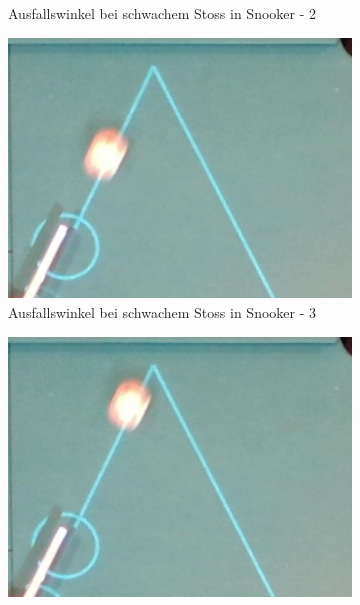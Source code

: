 \begin{figure}[h!]
\begin{subfigure}[b]{0.2\textwidth}
        \caption{Ausfallswinkel bei schwachem Stoss in Snooker - 2}
        \label{fig:rebound_angle_slow_snooker_2}
    \end{subfigure}
    \hfill
    \begin{subfigure}[b]{0.2\textwidth}
        \centering
        \includegraphics[width=1.0\linewidth]{../common/04_results/resources/simulation/rebound_angle_slow_snooker/00_rail_rebound_angle_slow_snooker_03.png}
        \caption{Ausfallswinkel bei schwachem Stoss in Snooker - 3}
        \label{fig:rebound_angle_slow_snooker_3}
    \end{subfigure}
    \hfill
    \begin{subfigure}[b]{0.2\textwidth}
        \centering
        \includegraphics[width=1.0\linewidth]{../common/04_results/resources/simulation/rebound_angle_slow_snooker/00_rail_rebound_angle_slow_snooker_04.png}

\end{subfigure}
\end{figure}
